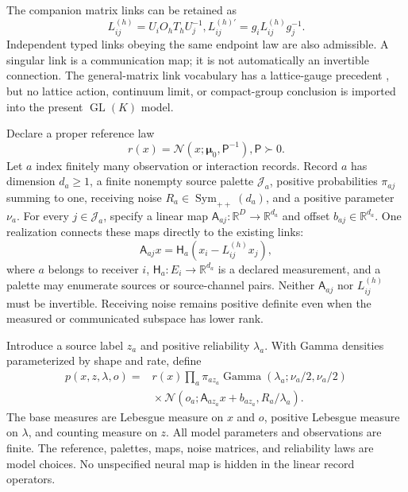 \documentclass[11pt]{article}
\newcommand{\R}{\mathbb R}
\newcommand{\SPD}{\operatorname{Sym}_{++}}
\newcommand{\GL}{\operatorname{GL}}
\newcommand{\Ga}{\operatorname{Gamma}}
\newcommand{\m}{\boldsymbol{\mu}}
\begin{document}
The companion matrix links can be retained as
\begin{equation}
L_{ij}^{(h)}=U_i O_h T_h U_j^{-1},
L_{ij}^{(h)\prime}=g_iL_{ij}^{(h)}g_j^{-1}.
\label{eq:inheritedlinks}
\end{equation}
Independent typed links obeying the same endpoint law are also admissible. A singular link is a communication map; it is not automatically an invertible connection. The general-matrix link vocabulary has a lattice-gauge precedent \citep{Wetterich2014}, but no lattice action, continuum limit, or compact-group conclusion is imported into the present $\GL(K)$ model.

Declare a proper reference law
\begin{equation}
r(x)=\mathcal N(x;\m_0,\mathsf P^{-1}), \mathsf P\succ0.
\label{eq:reference}
\end{equation}
Let $a$ index finitely many observation or interaction records. Record $a$ has dimension $d_a\ge1$, a finite nonempty source palette $\mathcal J_a$, positive probabilities $\pi_{aj}$ summing to one, receiving noise $R_a\in\SPD(d_a)$, and a positive parameter $\nu_a$. For every $j\in\mathcal J_a$, specify a linear map $\mathsf A_{aj}:\R^D\to\R^{d_a}$ and offset $b_{aj}\in\R^{d_a}$. One realization connects these maps directly to the existing links:
\begin{equation}
\mathsf A_{aj}x=\mathsf H_a(x_i-L_{ij}^{(h)}x_j),
\label{eq:recordlink}
\end{equation}
where $a$ belongs to receiver $i$, $\mathsf H_a:E_i\to\R^{d_a}$ is a declared measurement, and a palette may enumerate sources or source-channel pairs. Neither $\mathsf A_{aj}$ nor $L_{ij}^{(h)}$ must be invertible. Receiving noise remains positive definite even when the measured or communicated subspace has lower rank.

Introduce a source label $z_a$ and positive reliability $\lambda_a$. With Gamma densities parameterized by shape and rate, define
\begin{equation}
\begin{split}
p(x,z,\lambda,o)
={}&r(x)\prod_a \pi_{a z_a}
\Ga(\lambda_a;\nu_a/2,\nu_a/2)\\
&\mathrel{}\times\mathcal N(o_a;\mathsf A_{a z_a}x+b_{a z_a},R_a/\lambda_a).
\end{split}
\label{eq:jointlaw}
\end{equation}
The base measures are Lebesgue measure on $x$ and $o$, positive Lebesgue measure on $\lambda$, and counting measure on $z$. All model parameters and observations are finite. The reference, palettes, maps, noise matrices, and reliability laws are model choices. No unspecified neural map is hidden in the linear record operators.
\end{document}
